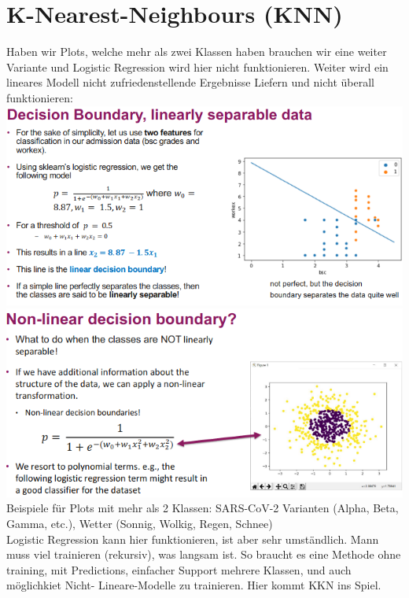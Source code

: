 \section{K-Nearest-Neighbours (KNN)}
Haben wir Plots, welche mehr als zwei Klassen haben brauchen wir eine weiter Variante und Logistic Regression wird hier nicht funktionieren. Weiter wird ein lineares Modell nicht zufriedenstellende Ergebnisse Liefern und nicht überall funktionieren:
\includegraphics[width=\linewidth]{img/decision_boundary.png}
\includegraphics[width=\linewidth]{img/non_linear_decision_boundary.png}
Beispiele für Plots mit mehr als 2 Klassen: SARS-CoV-2 Varianten (Alpha, Beta, Gamma, etc.), Wetter (Sonnig, Wolkig, Regen, Schnee)\\
Logistic Regression kann hier funktionieren, ist aber sehr umständlich. Mann muss viel trainieren (rekursiv), was langsam ist. So braucht es eine Methode ohne training, mit Predictions, einfacher Support mehrere Klassen, und auch möglichkiet Nicht- Lineare-Modelle zu trainieren. Hier kommt KKN ins Spiel.

